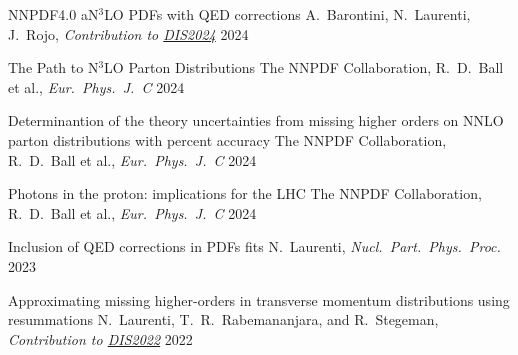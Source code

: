 
\begin{cvhonors}


    \cvhonor
    {NNPDF4.0 aN$^3$LO PDFs with QED corrections} %
    {A.\ Barontini, N.\ Laurenti, J.\ Rojo, \emph{Contribution to \href{https://inspirehep.net/conferences/2667502?ui-citation-summary=true}{DIS2024}}} %
    {\href{https://inspirehep.net/literature/2794583}{}}
    {2024}
    
    \cvhonor
    {The Path to N$^3$LO Parton Distributions} %
    {The NNPDF Collaboration, R.\ D.\ Ball et al., \emph{Eur.\ Phys.\ J.\ C}} %
    {\href{https://inspirehep.net/literature/2762925}{}}
    {2024}
    
    \cvhonor
    {Determinantion of the theory uncertainties from missing higher orders on NNLO parton distributions with percent accuracy} %
    {The NNPDF Collaboration, R.\ D.\ Ball et al., \emph{Eur.\ Phys.\ J.\ C}} %
    {\vspace{0.35cm}\href{https://inspirehep.net/literature/2749502}{}}
    {\vspace{0.35cm}2024}
    
    \cvhonor
    {Photons in the proton: implications for the LHC} %
    {The NNPDF Collaboration, R.\ D.\ Ball et al., \emph{Eur.\ Phys.\ J.\ C}} %
    {\href{https://inspirehep.net/literature/2747770}{}}
    {2024}

    \cvhonor
    {Inclusion of QED corrections in PDFs ﬁts}
    {N.\ Laurenti, \textit{Nucl.\ Part.\ Phys.\ Proc.}}
    {\href{https://doi.org/10.1016/j.nuclphysbps.2023.11.013}{}}
    {2023}
    
    \cvhonor
    {Approximating missing higher-orders in transverse momentum distributions using resummations}
    {N.~Laurenti, T.\ R.\ Rabemananjara, and R.\ Stegeman, \emph{Contribution to \href{https://inspirehep.net/conferences/1914506?ui-citation-summary=true}{DIS2022}}}
    {\vspace{0.35cm}\href{https://inspirehep.net/literature/2122473}{}}
    {\vspace{0.35cm}2022}

\end{cvhonors}